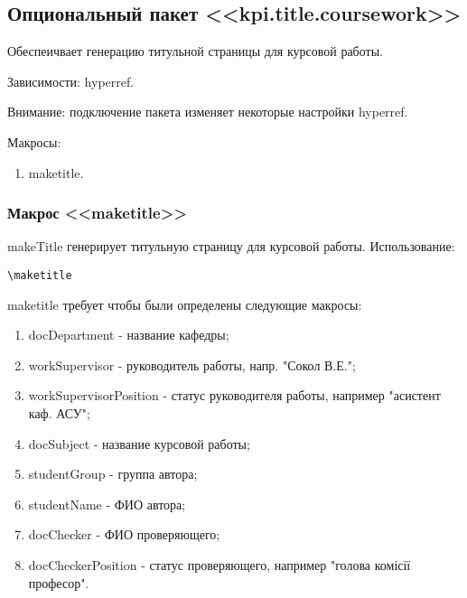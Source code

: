 \subsection{Опциональный пакет <<kpi.title.coursework>>}
Обеспеичвает генерацию титульной страницы для курсовой работы.\par
Зависимости: hyperref.\par
Внимание: подключение пакета изменяет некоторые настройки hyperref.\par
Макросы:
\begin{enumerate}
\item maketitle.
\end{enumerate}
\subsubsection{Макрос <<maketitle>>}
makeTitle генерирует титульную страницу для курсовой работы.
Использование:{\small
\begin{Verbatim}
\maketitle
\end{Verbatim}}
\normalsize
maketitle требует чтобы были определены следующие макросы:
\begin{enumerate}
\item docDepartment - название кафедры;
\item workSupervisor - руководитель работы, напр. "Сокол В.Е.";
\item workSupervisorPosition - статус руководителя работы, например "асистент каф. АСУ";
\item docSubject - название курсовой работы;
\item studentGroup - группа автора;
\item studentName - ФИО автора;
\item docChecker - ФИО проверяющего;
\item docCheckerPosition - статус проверяющего, например "голова комісії професор".
\end{enumerate}
